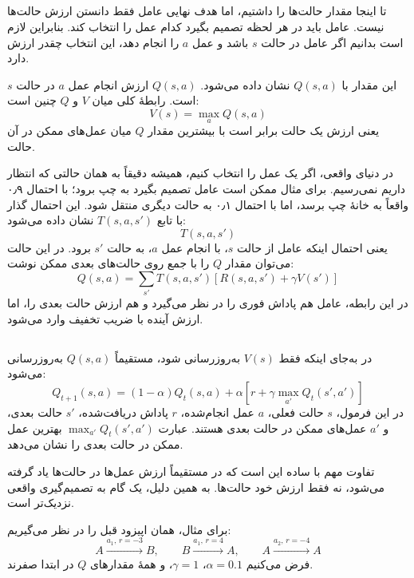\subsection{}
تا اینجا مقدار حالت‌ها را داشتیم، اما هدف نهایی عامل فقط دانستن ارزش حالت‌ها نیست. عامل باید در هر لحظه تصمیم بگیرد کدام عمل را انتخاب کند. بنابراین لازم است بدانیم اگر عامل در حالت \(s\) باشد و عمل \(a\) را انجام دهد، این انتخاب چقدر ارزش دارد.

این مقدار با \(Q(s,a)\) نشان داده می‌شود. \(Q(s,a)\) ارزش انجام عمل \(a\) در حالت \(s\) است. رابطهٔ کلی میان \(V\) و \(Q\) چنین است:
\[
V(s)=\max_a Q(s,a)
\]
یعنی ارزش یک حالت برابر است با بیشترین مقدار \(Q\) میان عمل‌های ممکن در آن حالت.

در دنیای واقعی، اگر یک عمل را انتخاب کنیم، همیشه دقیقاً به همان حالتی که انتظار داریم نمی‌رسیم. برای مثال ممکن است عامل تصمیم بگیرد به چپ برود؛ با احتمال ۰٫۹ واقعاً به خانهٔ چپ برسد، اما با احتمال ۰٫۱ به حالت دیگری منتقل شود. این احتمال گذار با تابع \(T(s,a,s')\) نشان داده می‌شود:
\[
T(s,a,s')
\]
یعنی احتمال اینکه عامل از حالت \(s\)، با انجام عمل \(a\)، به حالت \(s'\) برود. در این حالت می‌توان مقدار \(Q\) را با جمع روی حالت‌های بعدی ممکن نوشت:
\[
Q(s,a)=\sum_{s'} T(s,a,s')\left[R(s,a,s')+\gamma V(s')\right]
\]
در این رابطه، عامل هم پاداش فوری را در نظر می‌گیرد و هم ارزش حالت بعدی را، اما ارزش آینده با ضریب تخفیف وارد می‌شود.

\subsection{}
در  به‌جای اینکه فقط \(V(s)\) به‌روزرسانی شود، مستقیماً \(Q(s,a)\) به‌روزرسانی می‌شود:
\[
Q_{t+1}(s,a) = (1-\alpha)Q_t(s,a)
+ \alpha \left[r+\gamma \max_{a'}Q_t(s',a')\right]
\]
در این فرمول، \(s\) حالت فعلی، \(a\) عمل انجام‌شده، \(r\) پاداش دریافت‌شده، \(s'\) حالت بعدی، و \(a'\) عمل‌های ممکن در حالت بعدی هستند. عبارت \(\max_{a'}Q_t(s',a')\) بهترین عمل ممکن در حالت بعدی را نشان می‌دهد.

تفاوت مهم  با  ساده این است که در  مستقیماً ارزش عمل‌ها در حالت‌ها یاد گرفته می‌شود، نه فقط ارزش خود حالت‌ها. به همین دلیل،  یک گام به تصمیم‌گیری واقعی نزدیک‌تر است.

برای مثال، همان اپیزود قبل را در نظر می‌گیریم:
\[
A \xrightarrow{a_1,\, r=-3} B,\qquad
B \xrightarrow{a_1,\, r=4} A,\qquad
A \xrightarrow{a_2,\, r=-4} A
\]
فرض می‌کنیم \(\alpha=0.1\)، \(\gamma=1\)، و همهٔ مقدارهای \(Q\) در ابتدا صفرند.

